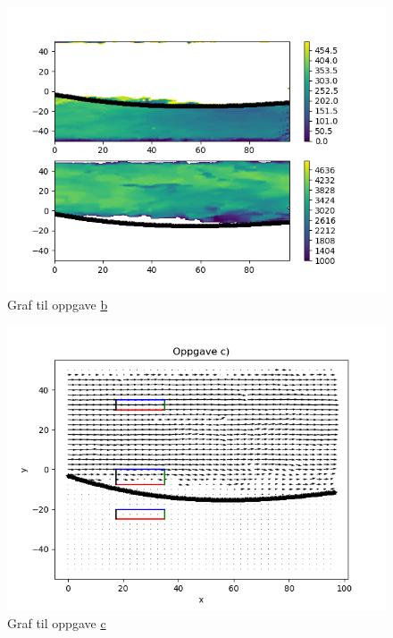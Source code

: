 \documentclass[a4paper,10pt,norsk]{article}
\begin{document}
	\newpage
	\begin{figure}[h!]
		\centering
		\caption{Graf til oppgave \hyperref[ass:b]{b}}
		\label{fig:b}
		\includegraphics{oppgave_b.png}
	\end{figure}
	\begin{figure}[h!]
		\centering
		\caption{Graf til oppgave \hyperref[ass:c]{c}} 
		\label{fig:c}
		\includegraphics{oppgave_c.png}
	\end{figure}
\end{document}
